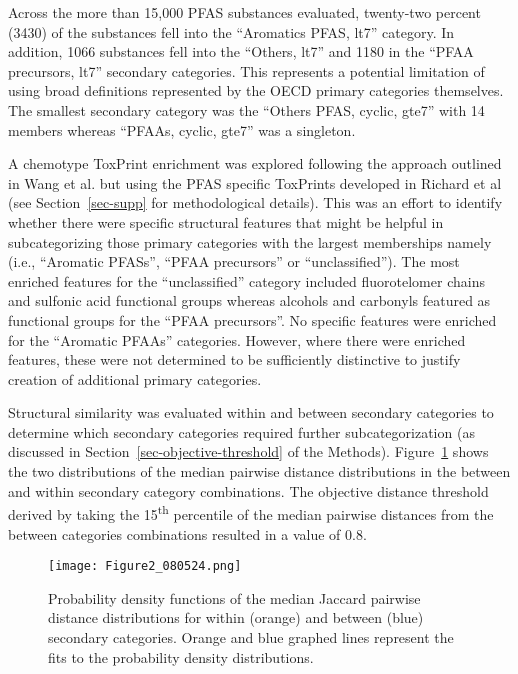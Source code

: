 \documentclass[
  super,
  preprint,
  3p]{elsarticle}
\begin{document}
Across the more than 15,000 PFAS substances evaluated, twenty-two
percent (3430) of the substances fell into the ``Aromatics PFAS, lt7''
category. In addition, 1066 substances fell into the ``Others, lt7'' and
1180 in the ``PFAA precursors, lt7'' secondary categories. This
represents a potential limitation of using broad definitions represented
by the OECD primary categories themselves. The smallest secondary
category was the ``Others PFAS, cyclic, gte7'' with 14 members whereas
``PFAAs, cyclic, gte7'' was a singleton.

A chemotype ToxPrint enrichment was explored following the approach
outlined in Wang et al.\citep{wang_high-throughput_2019} but using the
PFAS specific ToxPrints developed in Richard et al
\citep{richard_new_2023} (see Section~\ref{sec-supp} for methodological
details). This was an effort to identify whether there were specific
structural features that might be helpful in subcategorizing those
primary categories with the largest memberships namely (i.e., ``Aromatic
PFASs'', ``PFAA precursors'' or ``unclassified''). The most enriched
features for the ``unclassified'' category included fluorotelomer chains
and sulfonic acid functional groups whereas alcohols and carbonyls
featured as functional groups for the ``PFAA precursors''. No specific
features were enriched for the ``Aromatic PFAAs'' categories. However,
where there were enriched features, these were not determined to be
sufficiently distinctive to justify creation of additional primary
categories.

Structural similarity was evaluated within and between secondary
categories to determine which secondary categories required further
subcategorization (as discussed in Section~\ref{sec-objective-threshold}
of the Methods). Figure~\ref{fig-threshold} shows the two distributions
of the median pairwise distance distributions in the between and within
secondary category combinations. The objective distance threshold
derived by taking the 15\textsuperscript{th} percentile of the median
pairwise distances from the between categories combinations resulted in
a value of 0.8.

\begin{figure}

{\centering \texttt{[image: Figure2\_080524.png]}

}

\caption{\label{fig-threshold}Probability density functions of the
median Jaccard pairwise distance distributions for within (orange) and
between (blue) secondary categories. Orange and blue graphed lines
represent the fits to the probability density distributions.}

\end{figure}
\end{document}
